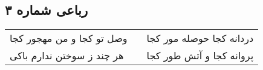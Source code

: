 \begin{center}
\section*{رباعی شماره ۳}
\label{sec:sh003}
\begin{longtable}{l p{0.5cm} r}
وصل تو کجا و من مهجور کجا
&&
دردانه کجا حوصله مور کجا
\\
هر چند ز سوختن ندارم باکی
&&
پروانه کجا و آتش طور کجا
\\
\end{longtable}
\end{center}

